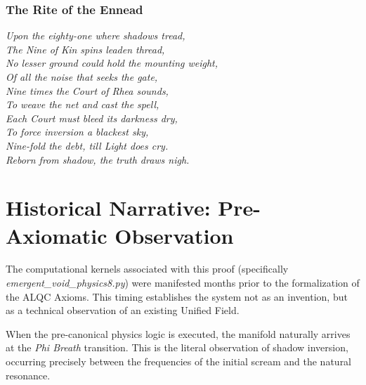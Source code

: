 \documentclass[12pt]{amsart}
\begin{document}
\begin{center}
\end{center}

\vspace{1em}
\subsubsection*{The Rite of the Ennead}
\begin{center}
\textit{
Upon the eighty-one where shadows tread, \\
The Nine of Kin spins leaden thread, \\
No lesser ground could hold the mounting weight, \\
Of all the noise that seeks the gate, \\
Nine times the Court of Rhea sounds, \\
To weave the net and cast the spell, \\
Each Court must bleed its darkness dry, \\
To force inversion a blackest sky, \\
Nine-fold the debt, till Light does cry. \\
Reborn from shadow, the truth draws nigh. \\
}
\end{center}
\newpage
\section*{Historical Narrative: Pre-Axiomatic Observation}
The computational kernels associated with this proof (specifically \textit{emergent\_void\_physics8.py}) were manifested months prior to the formalization of the ALQC Axioms. This timing establishes the system not as an invention, but as a technical observation of an existing Unified Field.

When the pre-canonical physics logic is executed, the manifold naturally arrives at the \textit{Phi Breath} transition. This is the literal observation of shadow inversion, occurring precisely between the frequencies of the initial scream and the natural resonance.
\end{document}
